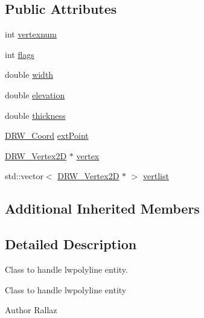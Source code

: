 \subsection*{Public Attributes}
\begin{DoxyCompactItemize}
\item 
int \hyperlink{classDRW__LWPolyline_a7aa318239f9956b6e0331199491e20a5}{vertexnum}
\item 
int \hyperlink{classDRW__LWPolyline_a66f6b406675a3c4ef540099356973510}{flags}
\item 
double \hyperlink{classDRW__LWPolyline_aedd6dd732a0b425711921104b52f8ce9}{width}
\item 
double \hyperlink{classDRW__LWPolyline_a86ba4b8badb8f008997401ec9f084a3b}{elevation}
\item 
double \hyperlink{classDRW__LWPolyline_abab38cc3e874a5c89469b382ebeb2284}{thickness}
\item 
\hyperlink{classDRW__Coord}{D\-R\-W\-\_\-\-Coord} \hyperlink{classDRW__LWPolyline_a859105f0a27e812dc074483809a38194}{ext\-Point}
\item 
\hyperlink{classDRW__Vertex2D}{D\-R\-W\-\_\-\-Vertex2\-D} $\ast$ \hyperlink{classDRW__LWPolyline_af59a2babb12d2f8865991c39cf464538}{vertex}
\item 
std\-::vector$<$ \hyperlink{classDRW__Vertex2D}{D\-R\-W\-\_\-\-Vertex2\-D} $\ast$ $>$ \hyperlink{classDRW__LWPolyline_a2da7f3449eec6588fb3765a1c9541404}{vertlist}
\end{DoxyCompactItemize}
\subsection*{Additional Inherited Members}


\subsection{Detailed Description}
Class to handle lwpolyline entity. 

Class to handle lwpolyline entity \begin{DoxyAuthor}{Author}
Rallaz 
\end{DoxyAuthor}


